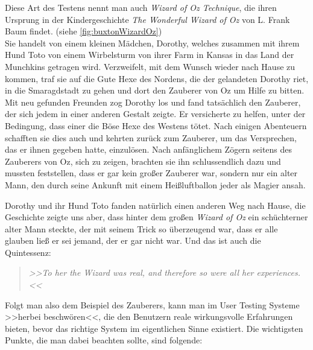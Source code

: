 \medskip Diese Art des Testens nennt man auch \emph{Wizard of Oz Technique}, die ihren Ursprung in der Kindergeschichte \emph{The Wonderful Wizard of Oz} von L. Frank Baum findet. (siehe \autoref{fig:buxtonWizardOz}) \\ Sie handelt von einem kleinen Mädchen, Dorothy, welches zusammen mit ihrem Hund Toto von einem Wirbelsturm von ihrer Farm in Kansas in das Land der Munchkins getragen wird. Verzweifelt, mit dem Wunsch wieder nach Hause zu kommen, traf sie auf die Gute Hexe des Nordens, die der gelandeten Dorothy riet, in die Smaragdstadt zu gehen und dort den Zauberer von Oz um Hilfe zu bitten. Mit neu gefunden Freunden zog Dorothy los und fand tatsächlich den Zauberer, der sich jedem in einer anderen Gestalt zeigte. Er versicherte zu helfen, unter der Bedingung, dass einer die Böse Hexe des Westens tötet. Nach einigen Abenteuern schafften sie dies auch und kehrten zurück zum Zauberer, um das Versprechen, das er ihnen gegeben hatte, einzulösen. Nach anfänglichem Zögern seitens des Zauberers von Oz, sich zu zeigen, brachten sie ihn schlussendlich dazu und mussten feststellen, dass er gar kein großer Zauberer war, sondern nur ein alter Mann, den durch seine Ankunft mit einem Heißluftballon jeder als Magier ansah. \citep{Baum:2008}

\medskip Dorothy und ihr Hund Toto fanden natürlich einen anderen Weg nach Hause, die Geschichte zeigte uns aber, dass hinter dem großen \emph{Wizard of Oz} ein schüchterner alter Mann steckte, der mit seinem Trick so überzeugend war, dass er alle glauben ließ er sei jemand, der er gar nicht war. Und das ist auch die Quintessenz: 

\begin{quote}
	\textsl{>>To her the Wizard was real, and therefore so were all her experiences.<<}
\begin{flushright}\citep{Buxton:2007}\end{flushright}
\end{quote}

Folgt man also dem Beispiel des Zauberers, kann man im User Testing Systeme >>herbei beschwören<<, die den Benutzern reale wirkungsvolle Erfahrungen bieten, bevor das richtige System im eigentlichen Sinne existiert. Die wichtigsten Punkte, die man dabei beachten sollte, sind folgende:

